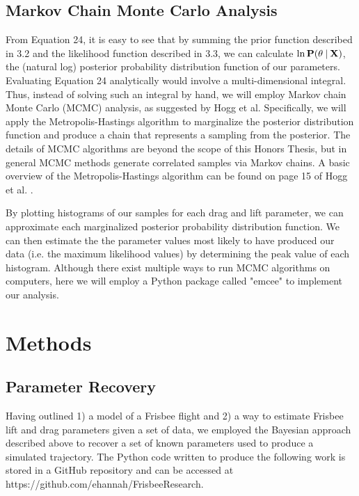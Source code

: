 \documentclass[a4paper,12pt, oneside]{article}
\newcommand\givenbase[1][]{\:#1\lvert\:}
\let\given\givenbase
\begin{document}
\subsection{Markov Chain Monte Carlo Analysis}
From Equation 24, it is easy to see that by summing the prior function described in 3.2 and the likelihood function described in 3.3, we can calculate $\ln\bold{P}(\theta\given\bold{X})$, the (natural log) posterior probability distribution function of our parameters. Evaluating Equation 24 analytically would involve a multi-dimensional integral. Thus, instead of solving such an integral by hand, we will employ Markov chain Monte Carlo (MCMC) analysis, as suggested by Hogg et al. Specifically, we will apply the Metropolis-Hastings algorithm to marginalize the posterior distribution function and produce a chain that represents a sampling from the posterior. The details of MCMC algorithms are beyond the scope of this Honors Thesis, but in general MCMC methods generate correlated samples via Markov chains. A basic overview of the Metropolis-Hastings algorithm can be found on page 15 of Hogg et al. \cite{hogg2010data}. 

By plotting histograms of our samples for each drag and lift parameter, we can approximate each marginalized posterior probability distribution function. We can then estimate the the parameter values most likely to have produced our data (i.e. the maximum likelihood values) by determining the peak value of each histogram. Although there exist multiple ways to run MCMC algorithms on computers, here we will employ a Python package called "emcee" to implement our analysis.
\section{Methods}
\subsection{Parameter Recovery}
Having outlined 1) a model of a Frisbee flight and 2) a way to estimate Frisbee lift and drag parameters given a set of data, we employed the Bayesian approach described above to recover a set of known parameters used to produce a simulated trajectory. The Python code written to produce the following work is stored in a GitHub repository and can be accessed at https://github.com/ehannah/FrisbeeResearch. 
\end{document}

